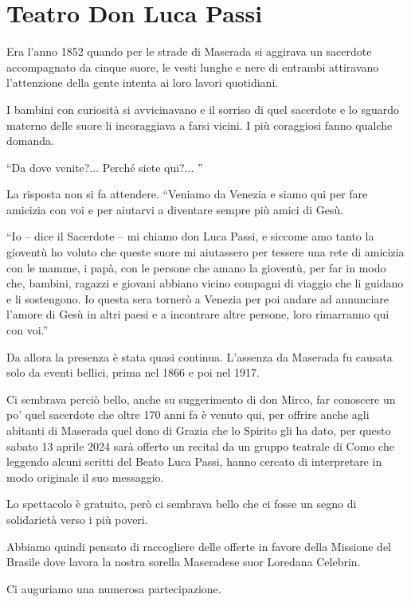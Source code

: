 \section{Teatro Don Luca Passi}


Era l’anno 1852 quando per le strade di Maserada si aggirava un sacerdote accompagnato da cinque suore, le vesti lunghe e nere di entrambi attiravano l’attenzione della gente intenta ai loro lavori quotidiani.

I bambini con curiosità si avvicinavano e il sorriso di quel sacerdote e lo sguardo materno delle suore li incoraggiava a farsi vicini. I più coraggiosi fanno qualche domanda.

``Da dove venite?... Perché siete qui?... ''

La risposta non si fa attendere. ``Veniamo da Venezia e siamo qui per fare amicizia con voi e per aiutarvi a diventare sempre più amici di Gesù.

``Io -- dice il Sacerdote -- mi chiamo don Luca Passi, e siccome amo tanto la gioventù ho voluto che queste suore mi aiutassero per tessere una rete di amicizia con le mamme, i papà, con le persone che amano la gioventù, per far in modo che, bambini, ragazzi e giovani abbiano vicino compagni di viaggio che li guidano e li sostengono.  Io questa sera tornerò a Venezia per poi andare ad annunciare l’amore di Gesù in altri paesi e a incontrare altre persone, loro rimarranno  qui con voi.''

Da allora la presenza è stata quasi continua. L’assenza da Maserada fu causata solo da eventi bellici, prima nel 1866 e poi nel 1917.

Ci sembrava perciò bello, anche su suggerimento di don Mirco, far conoscere un po’ quel sacerdote che  oltre 170 anni fa è venuto qui, per offrire anche agli abitanti di Maserada quel dono di Grazia che lo Spirito gli ha dato, per questo sabato 13 aprile 2024 sarà offerto un recital da un gruppo teatrale di Como che leggendo alcuni scritti del Beato Luca Passi, hanno cercato di interpretare in modo originale il suo messaggio.

Lo spettacolo è gratuito, però ci sembrava bello che ci fosse un segno di solidarietà verso i più poveri.

Abbiamo quindi pensato di raccogliere delle offerte in favore della Missione  del Brasile dove lavora la nostra sorella Maseradese suor Loredana Celebrin.

Ci auguriamo una numerosa partecipazione.


